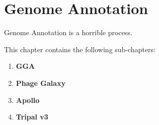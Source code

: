 \cleartorightpage

\chapter{Genome Annotation}\label{chapter:annotation}

\setcounter{figure}{-1}
\setcounter{table}{-1}
\setcounter{section}{-1}

Genome Annotation is a horrible process.

This chapter contains the following sub-chapters:

\begin{enumerate}[label=\ref{chapter:training}.\arabic*]
\itemsep-0.5em
\setcounter{enumi}{-1}
\item \textbf{GGA}
\item \textbf{Phage Galaxy}
\item \textbf{Apollo}
\item \textbf{Tripal v3}
\end{enumerate}
